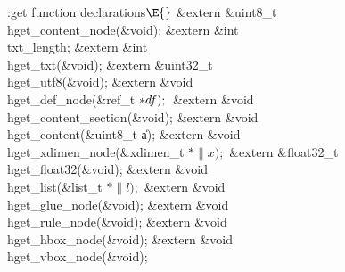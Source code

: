 \Y\B\4:get function declarations\X${}\E{}$\6
\&{extern} \&{uint8\_t} \\{hget\_content\_node}(\&{void});\6
\&{extern} \&{int} \\{txt\_length};\6
\&{extern} \&{int} \\{hget\_txt}(\&{void});\6
\&{extern} \&{uint32\_t} \\{hget\_utf8}(\&{void});\6
\&{extern} \&{void} \\{hget\_def\_node}(\&{ref\_t} ${}{*}\index{df+\\{df}}\\{df});{}$\6
\&{extern} \&{void} \\{hget\_content\_section}(\&{void});\6
\&{extern} \&{void} \\{hget\_content}(\&{uint8\_t} \|a);\6
\&{extern} \&{void} \\{hget\_xdimen\_node}(\&{xdimen\_t} ${}{*}\|x);{}$\6
\&{extern} \&{float32\_t} \\{hget\_float32}(\&{void});\6
\&{extern} \&{void} \\{hget\_list}(\&{list\_t} ${}{*}\|l);{}$\6
\&{extern} \&{void} \\{hget\_glue\_node}(\&{void});\6
\&{extern} \&{void} \\{hget\_rule\_node}(\&{void});\6
\&{extern} \&{void} \\{hget\_hbox\_node}(\&{void});\6
\&{extern} \&{void} \\{hget\_vbox\_node}(\&{void});\6
